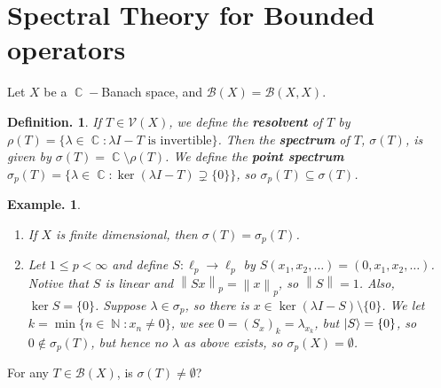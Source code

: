 \documentclass[11pt, a4paper]{memoir}
\DeclareMathOperator{\N}{{\mathbb{N}}}
\DeclareMathOperator{\C}{{\mathbb{C}}}
\newcommand{\norm}[1]{\ensuremath{\left\lVert#1\right\rVert}}
\theoremstyle{change}
\theoremstyle{plain}
\theoremstyle{nonumberplain}
\newtheorem{definition}{Definition.}
\newtheorem{example}{Example.}
\numberwithin{equation}{section}
\begin{document}
\section{Spectral Theory for Bounded operators}
Let $X$ be a $\C-$Banach space, and $\mathcal{B}(X)=\mathcal{B}(X,X)$.
\begin{definition}
    If $T\in\mathcal{V}(X)$, we define the \textbf{resolvent} of $T$ by $\rho(T)=\{\lambda\in\C:\lambda I-T\text{ is invertible}\}$.
    Then the \textbf{spectrum} of $T$, $\sigma(T)$, is given by $\sigma(T)=\C\setminus\rho(T)$.
    We define the \textbf{point spectrum} $\sigma_p(T)=\{\lambda\in \C:\ker(\lambda I-T)\supsetneq\{0\}\}$, so $\sigma_p(T)\subseteq\sigma(T)$.
\end{definition}
\begin{example}
    \begin{enumerate}[nl,r]
        \item If $X$ is finite dimensional, then $\sigma(T)=\sigma_p(T)$.
        \item Let $1\leq p<\infty$ and define $S:\ell_p\to\ell_p$ by $S(x_1,x_2,\ldots)=(0,x_1,x_2,\ldots)$.
            Notive that $S$ is linear and $\norm{Sx}_p=\norm{x}_p$, so $\norm{S}=1$.
            Also, $\ker S=\{0\}$.
            Suppose $\lambda\in\sigma_p$, so there is $x\in\ker(\lambda I-S)\setminus\{0\}$.
            We let $k=\min\{n\in\N:x_n\neq 0\}$, we see $0=(S_x)_k=\lambda_{x_k}$, but $\ket S=\{0\}$, so $0\notin\sigma_p(T)$, but hence no $\lambda$ as above exists, so $\sigma_p(X)=\emptyset$.
    \end{enumerate}
\end{example}
For any $T\in\mathcal{B}(X)$, is $\sigma(T)\neq\emptyset$?
\end{document}
